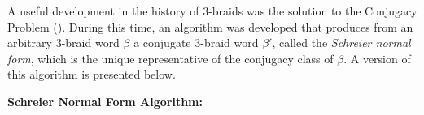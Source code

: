 \documentclass{article}
\newtheorem{remark}{Remark}[section]
\begin{document}

A useful development in the history of 3-braids was the solution to the Conjugacy Problem (\cite{Schreier}). During this time, an algorithm was developed that produces from an arbitrary 3-braid word $\beta$ a conjugate 3-braid word $\beta'$, called the \emph{Schreier normal form}, which is the unique representative of the conjugacy class of $\beta$. A version of this algorithm is presented below. 

%
%

\bigskip

\noindent \textbf{Schreier Normal Form Algorithm:} 
\end{document}
